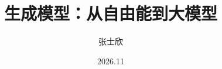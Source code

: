 \makeatletter
{}
\makeatother
\usepackage{beamerthemegenai}
\graphicspath{{figures/}{../shared/figures/}{../../figures/}}

\title{生成模型：从自由能到大模型}
\author{张士欣}
\date{2026.11}
\renewcommand{\titlefigure}{cover_probability_flow.pdf}
\renewcommand*{\titleurl}{github.com/refraction-ray/free-energy-to-llms}
